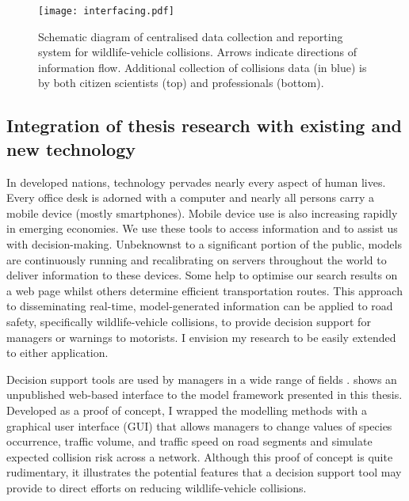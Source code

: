 \begin{figure*}[!h]
  \centering
  \texttt{[image: interfacing.pdf]}
  \caption[Centralised data collection and reporting system]{Schematic diagram of centralised data collection and reporting system for wildlife-vehicle collisions. Arrows indicate directions of information flow. Additional collection of collisions data (in blue) is by both citizen scientists (top) and professionals (bottom).}
  \label{wvc_server}
\end{figure*}

\subsection{Integration of thesis research with existing and new technology}

In developed nations, technology pervades nearly every aspect of human lives. Every office desk is adorned with a computer and nearly all persons carry a mobile device (mostly smartphones). Mobile device use is also increasing rapidly in emerging economies. We use these tools to access information and to assist us with decision-making. Unbeknownst to a significant portion of the public, models are continuously running and recalibrating on servers throughout the world to deliver information to these devices. Some help to optimise our search results on a web page whilst others determine efficient transportation routes. This approach to disseminating real-time, model-generated information can be applied to road safety, specifically wildlife-vehicle collisions, to provide decision support for managers or warnings to motorists. I envision my research to be easily extended to either application.

Decision support tools are used by managers in a wide range of fields \citep{shim02}.  shows an unpublished web-based interface to the model framework presented in this thesis. Developed as a proof of concept, I wrapped the modelling methods with a graphical user interface (GUI) that allows managers to change values of species occurrence, traffic volume, and traffic speed on road segments and simulate expected collision risk across a network. Although this proof of concept is quite rudimentary, it illustrates the potential features that a decision support tool may provide to direct efforts on reducing wildlife-vehicle collisions.

